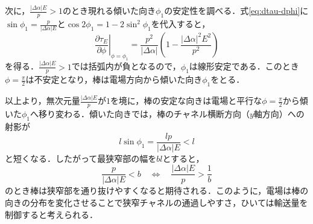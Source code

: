 \documentclass[dvipdfmx]{ampbt}
\begin{document}
  次に，$\frac{|\Delta\alpha|E}{p}>1$のとき現れる傾いた向き$\phi_1$の安定性を調べる．式\eqref{eq:dtau-dphi}に$\sin\phi_1=\frac{p}{|\Delta\alpha|E}$と$\cos2\phi_1=1-2\sin^2\phi_1$を代入すると，
  \begin{equation}
    \left.\frac{\partial\tau_E}{\partial\phi}\right|_{\phi=\phi_1}
    =\frac{p^2}{|\Delta\alpha|}
    \left(1-\frac{|\Delta\alpha|^2E^2}{p^2}\right)
  \end{equation}
  を得る．$\frac{|\Delta\alpha|E}{p}>1$では括弧内が負となるので，$\phi_1$は線形安定である．このとき$\phi=\frac{\pi}{2}$は不安定となり，棒は電場方向から傾いた向き$\phi_1$をとる．

  以上より，無次元量$\frac{|\Delta\alpha|E}{p}$が$1$を境に，棒の安定な向きは電場と平行な$\phi=\frac{\pi}{2}$から傾いた$\phi_1$へ移り変わる．傾いた向きでは，棒のチャネル横断方向（$y$軸方向）への射影が
  \begin{equation}
    l\sin\phi_1=\frac{lp}{|\Delta\alpha|E}<l
    \label{eq:y-projection}
  \end{equation}
  と短くなる．したがって最狭窄部の幅を$bl$とすると，
  \begin{equation}
    \frac{p}{|\Delta\alpha|E}<b
    \quad\Longleftrightarrow\quad
    \frac{|\Delta\alpha|E}{p}>\frac{1}{b}
  \end{equation}
  のとき棒は狭窄部を通り抜けやすくなると期待される．このように，電場は棒の向きの分布を変化させることで狭窄チャネルの通過しやすさ，ひいては輸送量を制御すると考えられる．
\end{document}
